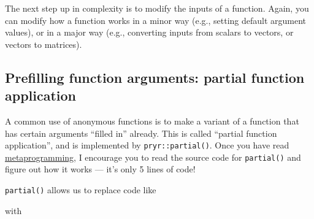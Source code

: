 
The next step up in complexity is to modify the inputs of a function.
Again, you can modify how a function works in a minor way (e.g., setting
default argument values), or in a major way (e.g., converting inputs
from scalars to vectors, or vectors to matrices).

\subsection{Prefilling function arguments: partial function application}

A common use of anonymous functions is to make a variant of a function
that has certain arguments ``filled in'' already. This is called
``partial function application'', and is implemented by
\texttt{pryr::partial()}. Once you have read
\hyperref[expressions]{metaprogramming}, I encourage you to read the
source code for \texttt{partial()} and figure out how it works --- it's
only 5 lines of code!  

\texttt{partial()} allows us to replace code like

\begin{Shaded}
\begin{Highlighting}[]
\StringTok{ } \NormalTok{)}
\StringTok{ }\NormalTok{(}
\end{Highlighting}
\end{Shaded}

with

\begin{Shaded}
\begin{Highlighting}[]
\StringTok{ } \NormalTok{)}
\StringTok{ }
\NormalTok{(} 
\end{Highlighting}
\end{Shaded}

